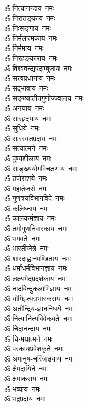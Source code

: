 \begin{multicols}{2}
\begin{flushleft}
        ॐ नित्यानन्दाय~नमः\\
        ॐ निरातङ्काय~नमः\\
        ॐ निःसङ्गाय~नमः\\
        ॐ निर्मलात्मकाय~नमः\\
        ॐ निर्ममाय~नमः\\
        ॐ निरहङ्काराय~नमः\\
        ॐ विश्ववन्द्यपदाम्बुजाय~नमः\\
        ॐ सत्त्वप्रधानाय~नमः\\
        ॐ सद्भावाय~नमः\\
        ॐ सङ्ख्यातीतगुणोज्ज्वलाय~नमः\hfill{}\\
                                        
        ॐ अनघाय~नमः\\
        ॐ सारहृदयाय~नमः\\
        ॐ सुधिये~नमः\\
        ॐ सारस्वतप्रदाय~नमः\\
        ॐ सत्यात्मने~नमः\\
        ॐ पुण्यशीलाय~नमः\\
        ॐ साङ्ख्ययोगविचक्षणाय~नमः\\
        ॐ तपोराशये~नमः\\
        ॐ महातेजसे~नमः\\
        ॐ गुणत्रयविभागविदे~नमः\hfill{}\\
                                        
        ॐ कलिघ्नाय~नमः\\
        ॐ कालकर्मज्ञाय~नमः\\
        ॐ तमोगुणनिवारकाय~नमः\\
        ॐ भगवते~नमः\\
        ॐ भारतीजेत्रे~नमः\\
        ॐ शारदाह्वानपण्डिताय~नमः\\
        ॐ धर्माधर्मविभागज्ञाय~नमः\\
        ॐ लक्ष्यभेदप्रदर्शकाय~नमः\\
        ॐ नादबिन्दुकलाभिज्ञाय~नमः\\
        ॐ योगिहृत्पद्मभास्कराय~नमः\hfill{}\\
                                        
        ॐ अतीन्द्रिय-ज्ञाननिधये~नमः\\
        ॐ नित्यानित्यविवेकवते~नमः\\
        ॐ चिदानन्दाय~नमः\\
        ॐ चिन्मयात्मने~नमः\\
        ॐ परकायप्रवेशकृते~नमः\\
        ॐ अमानुष-चरित्राढ्याय~नमः\\
        ॐ क्षेमदायिने~नमः\\
        ॐ क्षमाकराय~नमः\\
        ॐ भव्याय~नमः\\
        ॐ भद्रप्रदाय~नमः\hfill{}\\
                                        

\end{flushleft}
\end{multicols}
